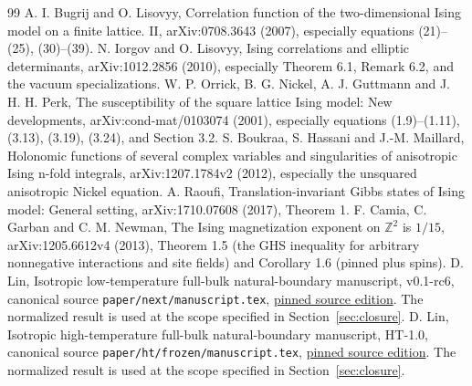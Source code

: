 \documentclass[11pt]{article}
\numberwithin{equation}{section}
\theoremstyle{definition}
\begin{document}
\begin{thebibliography}{99}
 A. I. Bugrij and O. Lisovyy, Correlation function of the two-dimensional
Ising model on a finite lattice. II, arXiv:0708.3643 (2007), especially
equations (21)--(25), (30)--(39).
 N. Iorgov and O. Lisovyy, Ising correlations and elliptic determinants,
arXiv:1012.2856 (2010), especially Theorem 6.1, Remark 6.2,
and the vacuum specializations.
 W. P. Orrick, B. G. Nickel, A. J. Guttmann and J. H. H. Perk,
The susceptibility of the square lattice Ising model: New developments,
arXiv:cond-mat/0103074 (2001), especially equations (1.9)--(1.11),
(3.13), (3.19), (3.24), and Section 3.2.
 S. Boukraa, S. Hassani and J.-M. Maillard,
Holonomic functions of several complex variables and singularities of
anisotropic Ising n-fold integrals, arXiv:1207.1784v2 (2012),
especially the unsquared anisotropic Nickel equation.
 A. Raoufi, Translation-invariant Gibbs states of Ising model:
General setting, arXiv:1710.07608 (2017), Theorem 1.
 F. Camia, C. Garban and C. M. Newman, The Ising magnetization
exponent on $\mathbb Z^2$ is $1/15$, arXiv:1205.6612v4 (2013),
Theorem 1.5 (the GHS inequality for arbitrary nonnegative interactions
and site fields) and Corollary 1.6 (pinned plus spins).
 D. Lin, Isotropic low-temperature full-bulk natural-boundary manuscript,
v0.1-rc6, canonical source \texttt{paper/next/manuscript.tex},
\href{https://github.com/LeoLam233/ising-bulk-natural-boundary/tree/a234328e887416ac4f242e3a24f99bc2d123be38/paper/next}{pinned source edition}.
The normalized result is used at the scope specified in
Section~\ref{sec:closure}.
 D. Lin, Isotropic high-temperature full-bulk natural-boundary manuscript,
HT-1.0, canonical source \texttt{paper/ht/frozen/manuscript.tex},
\href{https://github.com/LeoLam233/ising-bulk-natural-boundary/tree/a234328e887416ac4f242e3a24f99bc2d123be38/paper/ht/frozen}{pinned source edition}.
The normalized result is used at the scope specified in
Section~\ref{sec:closure}.
\end{thebibliography}
\end{document}
